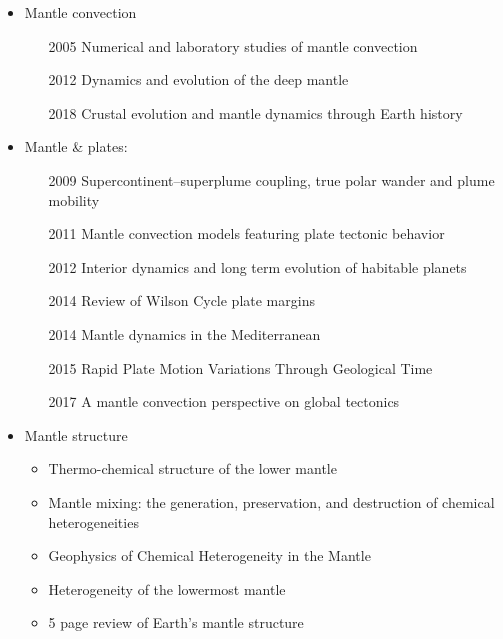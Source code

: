 \begin{itemize}
\item Mantle convection 

   \begin{itemize}
   \item [2005] Numerical and laboratory studies of mantle convection \cite{taxn05}
   \item [2012] Dynamics and evolution of the deep mantle  \cite{tack12}
   \item [2018] Crustal evolution and mantle dynamics through Earth history \cite{kore18}
   \end{itemize}

\item Mantle \& plates:
   \begin{itemize}
   \item [2009] Supercontinent–superplume coupling, true polar wander and plume mobility \cite{lizh09}
   \item [2011] Mantle convection models featuring plate tectonic behavior \cite{lowm11}
   \item [2012] Interior dynamics and long term evolution of habitable planets \cite{taab12}
   \item [2014] Review of Wilson Cycle plate margins \cite{buto14}
   \item [2014]Mantle dynamics in the Mediterranean \cite{faba14}
   \item [2015] Rapid Plate Motion Variations Through Geological Time \cite{iabu15}
   \item [2017] A mantle convection perspective on global tectonics \cite{cogu17}
   \end{itemize}

\item Mantle structure
   \begin{itemize}
   \item Thermo-chemical structure of the lower mantle \cite{dett07}
   \item Mantle mixing: the generation, preservation, and destruction of chemical heterogeneities \cite{vahb02}
   \item Geophysics of Chemical Heterogeneity in the Mantle \cite{stli12}
   \item Heterogeneity of the lowermost mantle \cite{garn00}
   \item 5 page review of Earth's mantle structure \cite{hewo01}
   \end{itemize}


\end{itemize}
